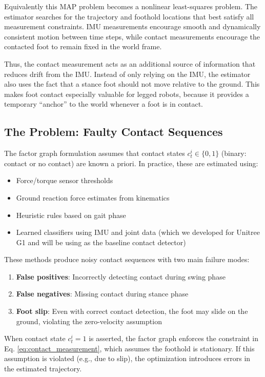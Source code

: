 \documentclass[conference]{IEEEtran}
\begin{document}
Equivalently this MAP problem becomes a nonlinear least-squares 
problem. The estimator searches for the trajectory and foothold locations that best satisfy all 
measurement constraints. IMU measurements encourage smooth and dynamically consistent motion between 
time steps, while contact measurements encourage the contacted foot to remain fixed in the world frame.

Thus, the contact measurement acts as an additional source of information that reduces drift from the IMU. Instead of 
only relying on the IMU, the estimator also uses the fact that a stance foot should not move relative to 
the ground. This makes foot contact especially valuable for legged robots, because it provides a 
temporary ``anchor'' to the world whenever a foot is in contact.

\subsection{The Problem: Faulty Contact Sequences}
The factor graph formulation assumes that contact states $c_t^i \in \{0, 1\}$ (binary: contact or no contact) are known a priori. In practice, these are estimated using:
\begin{itemize}
\item Force/torque sensor thresholds
\item Ground reaction force estimates from kinematics
\item Heuristic rules based on gait phase
\item Learned classifiers using IMU and joint data (which we developed for Unitree G1 and will be using as the baseline contact detector)
\end{itemize}

These methods produce noisy contact sequences with two main failure modes:
\begin{enumerate}
\item \textbf{False positives}: Incorrectly detecting contact during swing phase
\item \textbf{False negatives}: Missing contact during stance phase
\item \textbf{Foot slip}: Even with correct contact detection, the foot may slide on the ground, violating the zero-velocity assumption
\end{enumerate}

When contact state $c_t^i = 1$ is asserted, the factor graph enforces the constraint in Eq. \ref{eq:contact_measurement}, which assumes the foothold is stationary. If this assumption is violated (e.g., due to slip), the optimization introduces errors in the estimated trajectory.
\end{document}
